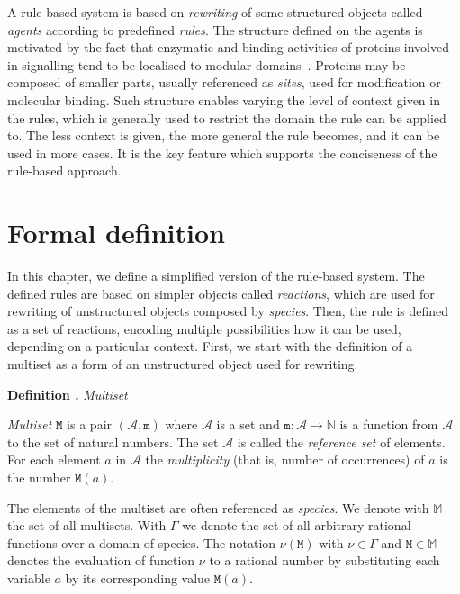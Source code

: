 \documentclass[11pt,a4paper]{report}
\newcounter{counter}[section]
\renewcommand{\thecounter}{\thechapter.\arabic{counter}}
\newenvironment{definition}[1]{\bigskip\refstepcounter{counter}\noindent\textbf{Definition \thecounter } \emph{#1} \par\nopagebreak\noindent \begin{itshape}}{\end{itshape}\bigskip}
\begin{document}
A rule-based system is based on \emph{rewriting} of some structured objects called \emph{agents} according to predefined \emph{rules}. The structure defined on the agents is motivated by the fact that enzymatic and binding activities of proteins involved in signalling tend to be localised to modular domains~\cite{pawson2003assembly}. Proteins may be composed of smaller parts, usually referenced as \emph{sites}, used for modification or molecular binding. Such structure enables varying the level of context given in the rules, which is generally used to restrict the domain the rule can be applied to. The less context is given, the more general the rule becomes, and it can be used in more cases. It is the key feature which supports the conciseness of the rule-based approach.

\section{Formal definition}

In this chapter, we define a simplified version of the rule-based system. The defined rules are based on simpler objects called \emph{reactions}, which are used for rewriting of unstructured objects composed by \emph{species}. Then, the rule is defined as a set of reactions, encoding multiple possibilities how it can be used, depending on a particular context. First, we start with the definition of a multiset as a form of an unstructured object used for rewriting.

\begin{definition}{Multiset}
\emph{Multiset} $\mathtt{M}$ is a pair $(\mathcal{A}, \mathtt{m})$ where $\mathcal{A}$ is a set and $ \mathtt{m} : \mathcal{A} \rightarrow \mathbb{N} $ is a function from $\mathcal{A}$ to the set of natural numbers. The set $\mathcal{A}$ is called the \emph{reference set} of elements. For each element $\mathit{a}$ in $\mathcal{A}$ the \emph{multiplicity} (that is, number of occurrences) of $\mathit{a}$ is the number $\mathtt{M}(\mathit{a})$.
\end{definition}

The elements of the multiset are often referenced as \emph{species}. We denote with $\mathbb{M}$ the set of all multisets. With $\Gamma$ we denote the set of all arbitrary rational functions over a domain of species. The notation $\nu(\mathtt{M})$ with $\nu \in \Gamma$ and $\mathtt{M} \in \mathbb{M}$ denotes the evaluation of function $\nu$ to a rational number by substituting each variable $\mathit{a}$ by its corresponding value $\mathtt{M}(\mathit{a})$.
\end{document}
